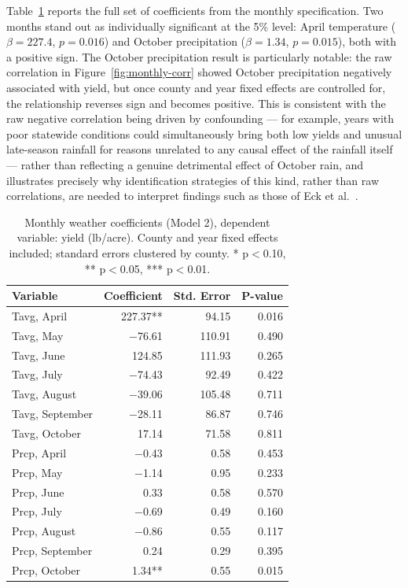 \documentclass{article}
\begin{document}
Table~\ref{tab:monthly-coefs} reports the full set of coefficients from the monthly specification. Two months stand out as individually significant 
at the 5\% level: April temperature ($\beta = 227.4$, $p = 0.016$) and October precipitation ($\beta = 1.34$, $p = 0.015$), both with a positive sign. 
The October precipitation result is particularly notable: the raw correlation in Figure~\ref{fig:monthly-corr} showed October precipitation negatively 
associated with yield, but once county and year fixed effects are controlled for, the relationship reverses sign and becomes positive. 
This is consistent with the raw negative correlation being driven by confounding --- for example, years with poor statewide conditions 
could simultaneously bring both low yields and unusual late-season rainfall for reasons unrelated to any causal effect of the rainfall 
itself --- rather than reflecting a genuine detrimental effect of October rain, and illustrates precisely why identification strategies 
of this kind, rather than raw correlations, are needed to interpret findings such as those of Eck et al.~\cite{InfluceceOfGrowingSeasonTempAnomalies}.

\begin{table}[h]
\centering
\caption{Monthly weather coefficients (Model 2), dependent variable: yield (lb/acre). County and year fixed effects included; standard errors clustered by county. * p$<$0.10, ** p$<$0.05, *** p$<$0.01.}
\label{tab:monthly-coefs}
\begin{tabular}{lrrr}
\toprule
Variable & Coefficient & Std. Error & P-value \\
\midrule
Tavg, April & 227.37** & 94.15 & 0.016 \\
Tavg, May & $-$76.61 & 110.91 & 0.490 \\
Tavg, June & 124.85 & 111.93 & 0.265 \\
Tavg, July & $-$74.43 & 92.49 & 0.422 \\
Tavg, August & $-$39.06 & 105.48 & 0.711 \\
Tavg, September & $-$28.11 & 86.87 & 0.746 \\
Tavg, October & 17.14 & 71.58 & 0.811 \\
Prcp, April & $-$0.43 & 0.58 & 0.453 \\
Prcp, May & $-$1.14 & 0.95 & 0.233 \\
Prcp, June & 0.33 & 0.58 & 0.570 \\
Prcp, July & $-$0.69 & 0.49 & 0.160 \\
Prcp, August & $-$0.86 & 0.55 & 0.117 \\
Prcp, September & 0.24 & 0.29 & 0.395 \\
Prcp, October & 1.34** & 0.55 & 0.015 \\
\bottomrule
\end{tabular}
\end{table}
\end{document}

